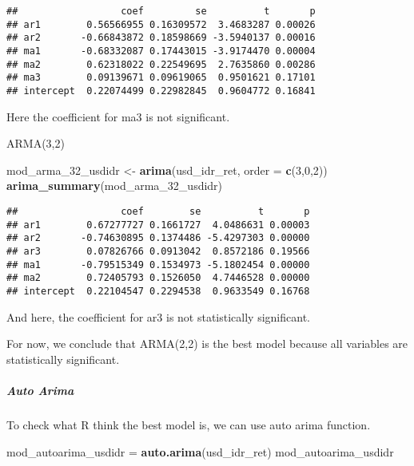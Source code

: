 \documentclass[]{article}
\newenvironment{Shaded}{\begin{snugshade}}{\end{snugshade}}
\newcommand{\KeywordTok}[1]{\textcolor[rgb]{0.13,0.29,0.53}{\textbf{#1}}}
\newcommand{\DataTypeTok}[1]{\textcolor[rgb]{0.13,0.29,0.53}{#1}}
\newcommand{\DecValTok}[1]{\textcolor[rgb]{0.00,0.00,0.81}{#1}}
\newcommand{\StringTok}[1]{\textcolor[rgb]{0.31,0.60,0.02}{#1}}
\newcommand{\NormalTok}[1]{#1}
\let\oldsubparagraph\subparagraph
\renewcommand{\subparagraph}[1]{\oldsubparagraph{#1}\mbox{}}
\begin{document}
\begin{verbatim}
##                  coef         se          t       p
## ar1        0.56566955 0.16309572  3.4683287 0.00026
## ar2       -0.66843872 0.18598669 -3.5940137 0.00016
## ma1       -0.68332087 0.17443015 -3.9174470 0.00004
## ma2        0.62318022 0.22549695  2.7635860 0.00286
## ma3        0.09139671 0.09619065  0.9501621 0.17101
## intercept  0.22074499 0.22982845  0.9604772 0.16841
\end{verbatim}

Here the coefficient for ma3 is not significant.

ARMA(3,2)

\begin{Shaded}
\begin{Highlighting}[]
\NormalTok{mod_arma_32_usdidr <-}\StringTok{ }\KeywordTok{arima}\NormalTok{(usd_idr_ret, }\DataTypeTok{order =} \KeywordTok{c}\NormalTok{(}\DecValTok{3}\NormalTok{,}\DecValTok{0}\NormalTok{,}\DecValTok{2}\NormalTok{)) }
\KeywordTok{arima_summary}\NormalTok{(mod_arma_32_usdidr) }
\end{Highlighting}
\end{Shaded}

\begin{verbatim}
##                  coef        se          t       p
## ar1        0.67277727 0.1661727  4.0486631 0.00003
## ar2       -0.74630895 0.1374486 -5.4297303 0.00000
## ar3        0.07826766 0.0913042  0.8572186 0.19566
## ma1       -0.79515349 0.1534973 -5.1802454 0.00000
## ma2        0.72405793 0.1526050  4.7446528 0.00000
## intercept  0.22104547 0.2294538  0.9633549 0.16768
\end{verbatim}

And here, the coefficient for ar3 is not statistically significant.

For now, we conclude that ARMA(2,2) is the best model because all
variables are statistically significant.

\subparagraph{Auto Arima}\label{auto-arima}

To check what R think the best model is, we can use auto arima function.

\begin{Shaded}
\begin{Highlighting}[]
\NormalTok{mod_autoarima_usdidr =}\StringTok{ }\KeywordTok{auto.arima}\NormalTok{(usd_idr_ret)}
\NormalTok{mod_autoarima_usdidr}
\end{Highlighting}
\end{Shaded}
\end{document}
